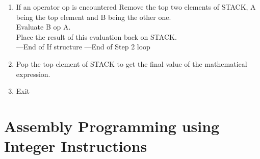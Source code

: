 \begin{ExerciseList}
\begin {enumerate}
\item If an operator op is encountered
               Remove the top two elements of STACK, A being the top element and B being the other one.\\
               Evaluate B op A.\\
               Place the result of this evaluation back on STACK.\\
---End of If structure
---End of Step 2 loop
\item Pop the top element of STACK to get the final value of the mathematical expression.
\item Exit\\
\end{enumerate}


\end{ExerciseList}
\section*{Assembly Programming using Integer Instructions}

